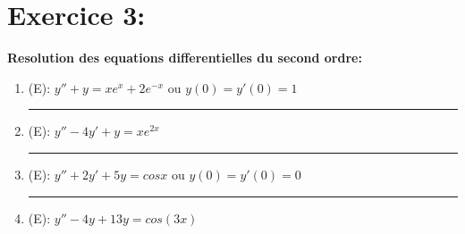 \documentclass[a4paper,12pt]{article}
\begin{document}

\section*{Exercice 3:}
\textbf{Resolution des equations differentielles du second ordre:}

\begin{enumerate}
	\setcounter{enumi}{0}
	\vspace{1cm}
	\item (E): $y'' + y = xe^x + 2e^{-x}$ ou $y(0) = y'(0) = 1$ \\
	
	
	\vspace{1cm}
	\hrule
	\vspace{1cm}
	
	\item (E): $y'' - 4y' + y = xe^{2x}$ \\
	
	
	\vspace{1cm}
	\hrule
	\vspace{1cm}
	
	\item (E): $y'' + 2y' + 5y = cosx$ ou $y(0) = y'(0) = 0$\\
	
	
	\vspace{1cm}
	\hrule
	\vspace{1cm}
	
	\item (E): $y'' - 4y + 13y = cos(3x)$
	 \\
	
	\vspace{1cm}
\end{enumerate}
\end{document}
